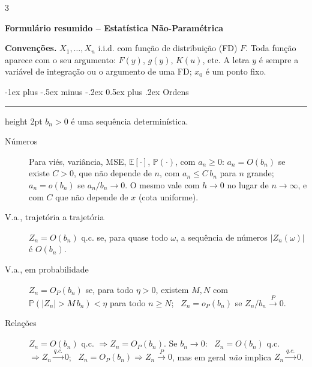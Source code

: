 \documentclass[10pt,landscape]{article}
\makeatletter
\newcommand{\E}{\mathbb{E}}
\renewcommand{\P}{\mathbb{P}}
\newcommand{\qc}{\xrightarrow{q.c.}}
\newcommand{\pto}{\xrightarrow{P}}
\renewcommand{\section}{\@startsection{section}{1}{0mm}%
                                {-1ex plus -.5ex minus -.2ex}%
                                {0.5ex plus .2ex}%
                                {\normalfont\small\bfseries}}
\newcommand{\secrule}{\smallskip \hrule height 2pt \smallskip}
\makeatother
\begin{document}
\raggedright
\footnotesize
\begin{multicols}{3}
\setlength{\columnsep}{8pt}

{\normalsize\bfseries Formulário resumido -- Estatística Não-Paramétrica}\par
\smallskip
\textbf{Convenções.} $X_1,\dots,X_n$ i.i.d. com função de distribuição (FD) $F$. Toda função aparece com o seu argumento: $F(y)$, $g(y)$, $K(u)$, etc. A letra $y$ é sempre a variável de integração ou o argumento de uma FD; $x_0$ é um ponto fixo.

\section{Ordens}\secrule
$b_n>0$ é uma sequência determinística.
\begin{description}
  \item[Números] Para viés, variância, MSE, $\E[\cdot]$, $\P(\cdot)$, com $a_n\ge0$: $a_n=O(b_n)$ se existe $C>0$, que não depende de $n$, com $a_n\le C\,b_n$ para $n$ grande; \ $a_n=o(b_n)$ se $a_n/b_n\to0$. O mesmo vale com $h\to0$ no lugar de $n\to\infty$, e com $C$ que não depende de $x$ (cota uniforme).
  \item[V.a., trajetória a trajetória] $Z_n=O(b_n)$ q.c. se, para quase todo $\omega$, a sequência de números $|Z_n(\omega)|$ é $O(b_n)$.
  \item[V.a., em probabilidade] $Z_n=O_P(b_n)$ se, para todo $\eta>0$, existem $M,N$ com $\P(|Z_n|>M\,b_n)<\eta$ para todo $n\ge N$; \ $Z_n=o_P(b_n)$ se $Z_n/b_n\pto0$.
  \item[Relações] $Z_n=O(b_n)$ q.c. $\Rightarrow Z_n=O_P(b_n)$. Se $b_n\to0$: \ $Z_n=O(b_n)$ q.c. $\Rightarrow Z_n\qc0$; \ $Z_n=O_P(b_n)\Rightarrow Z_n\pto0$, mas em geral \emph{não} implica $Z_n\qc0$.
\end{description}


\end{multicols}
\end{document}
